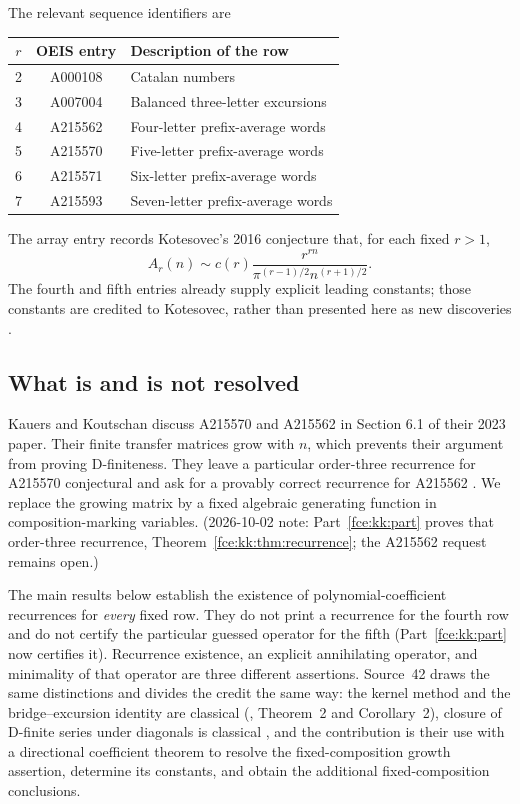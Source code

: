 \documentclass[11pt,a4paper]{article}
\numberwithin{equation}{section}
\theoremstyle{definition}\newtheorem{definition}[theorem]{Definition}
\theoremstyle{remark}\newtheorem{remark}[theorem]{Remark}
\begin{document}
The relevant sequence identifiers are
\begin{center}
\begin{tabular}{ccl}
\toprule
$r$ & OEIS entry & Description of the row \\
\midrule
2&A000108&Catalan numbers\\
3&A007004&Balanced three-letter excursions\\
4&A215562&Four-letter prefix-average words\\
5&A215570&Five-letter prefix-average words\\
6&A215571&Six-letter prefix-average words\\
7&A215593&Seven-letter prefix-average words\\
\bottomrule
\end{tabular}
\end{center}
The array entry records Kotesovec's 2016 conjecture that, for each fixed
$r>1$,
\begin{equation}\label{fce:eq:oeisconj}
 A_r(n)\sim c(r)\frac{r^{rn}}{\pi^{(r-1)/2}n^{(r+1)/2}}.
\end{equation}
The fourth and fifth entries already supply explicit leading constants;
those constants are credited to Kotesovec, rather than presented here as
new discoveries \cite{oeisarray,oeis4,oeis5}.

\subsection{What is and is not resolved}
Kauers and Koutschan discuss A215570 and A215562 in Section 6.1 of their
2023 paper. Their finite transfer matrices grow with $n$, which prevents
their argument from proving D-finiteness. They leave a particular
order-three recurrence for A215570 conjectural and ask for a provably
correct recurrence for A215562 \cite{kk}. We replace the growing matrix
by a fixed algebraic generating function in composition-marking variables.
(2026-10-02 note: Part~\ref{fce:kk:part} proves that order-three
recurrence, Theorem~\ref{fce:kk:thm:recurrence}; the A215562 request
remains open.)

The main results below establish the existence of polynomial-coefficient
recurrences for \emph{every} fixed row. They do not print a recurrence for
the fourth row and do not certify the particular guessed operator for
the fifth (Part~\ref{fce:kk:part} now certifies it). Recurrence existence, an explicit annihilating operator, and
minimality of that operator are three different assertions. Source~42
draws the same distinctions and divides the credit the same way: the
kernel method and the bridge--excursion identity are classical (\cite{bf},
Theorem~2 and Corollary~2), closure of D-finite series under diagonals is
classical \cite{lipshitz}, and the contribution is their use with a
directional coefficient theorem to resolve the fixed-composition growth
assertion, determine its constants, and obtain the additional
fixed-composition conclusions.
\end{document}
